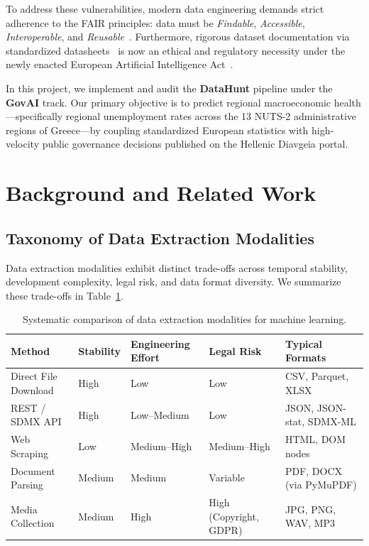\documentclass[11pt,a4paper]{article}
\begin{document}
To address these vulnerabilities, modern data engineering demands strict adherence to the FAIR principles: data must be \textit{Findable}, \textit{Accessible}, \textit{Interoperable}, and \textit{Reusable}~\citep{wilkinson2016fair}. Furthermore, rigorous dataset documentation via standardized datasheets~\citep{gebru2021datasheets} is now an ethical and regulatory necessity under the newly enacted European Artificial Intelligence Act~\citep{eu2024aiact}.

In this project, we implement and audit the \textbf{DataHunt} pipeline under the \textbf{GovAI} track. Our primary objective is to predict regional macroeconomic health---specifically regional unemployment rates across the 13 NUTS-2 administrative regions of Greece---by coupling standardized European statistics with high-velocity public governance decisions published on the Hellenic Diavgeia portal.

\section{Background and Related Work}
\subsection{Taxonomy of Data Extraction Modalities}
Data extraction modalities exhibit distinct trade-offs across temporal stability, development complexity, legal risk, and data format diversity. We summarize these trade-offs in Table~\ref{tab:methods}.

\begin{table}[ht]\centering\small
\caption{Systematic comparison of data extraction modalities for machine learning.}\label{tab:methods}
\begin{tabular}{@{}lllll@{}}\toprule
\textbf{Method} & \textbf{Stability} & \textbf{Engineering Effort} & \textbf{Legal Risk} & \textbf{Typical Formats}\\\midrule
Direct File Download & High & Low & Low & CSV, Parquet, XLSX\\
REST / SDMX API & High & Low--Medium & Low & JSON, JSON-stat, SDMX-ML\\
Web Scraping & Low & Medium--High & Medium--High & HTML, DOM nodes\\
Document Parsing & Medium & Medium & Variable & PDF, DOCX (via PyMuPDF)\\
Media Collection & Medium & High & High (Copyright, GDPR) & JPG, PNG, WAV, MP3\\\bottomrule
\end{tabular}
\end{table}
\end{document}
